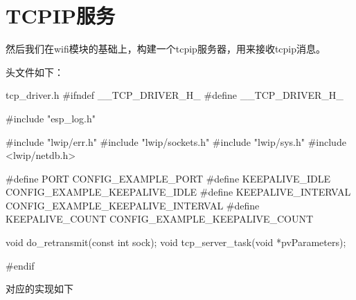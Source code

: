 \documentclass[lang=cn,newtx,10pt,scheme=chinese]{elegantbook}
\begin{document}
\chapter{TCPIP服务}

然后我们在wifi模块的基础上，构建一个tcpip服务器，用来接收tcpip消息。

头文件如下：

\begin{mycode}{tcp\_driver.h}
#ifndef __TCP_DRIVER_H_
#define __TCP_DRIVER_H_

#include "esp_log.h"

#include "lwip/err.h"
#include "lwip/sockets.h"
#include "lwip/sys.h"
#include <lwip/netdb.h>

#define PORT CONFIG_EXAMPLE_PORT
#define KEEPALIVE_IDLE CONFIG_EXAMPLE_KEEPALIVE_IDLE
#define KEEPALIVE_INTERVAL CONFIG_EXAMPLE_KEEPALIVE_INTERVAL
#define KEEPALIVE_COUNT CONFIG_EXAMPLE_KEEPALIVE_COUNT

void do_retransmit(const int sock);
void tcp_server_task(void *pvParameters);

#endif
\end{mycode}

对应的实现如下
\end{document}
